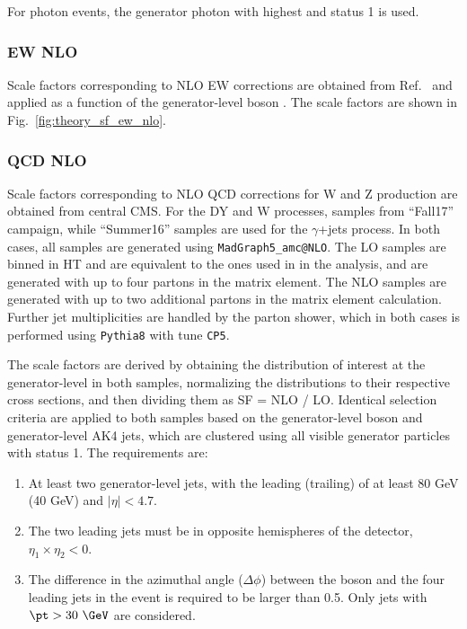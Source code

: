 For photon events, the generator photon with highest \pt and status 1 is used.

\subsubsection{EW NLO}
Scale factors corresponding to NLO EW corrections are obtained from Ref.~\cite{DMTheory} and applied as a function of the generator-level boson \pt. The scale factors are shown in Fig.~\ref{fig:theory_sf_ew_nlo}.

\subsubsection{QCD NLO}

Scale factors corresponding to NLO QCD corrections for W and Z production are obtained from central CMS. For the DY and W processes, samples from ``Fall17'' campaign, while ``Summer16'' samples are used for the $\gamma$+jets process. In both cases, all samples are generated using \texttt{MadGraph5\_amc@NLO}. The LO samples are binned in HT and are equivalent to the ones used in in the analysis, and are generated with up to four partons in the matrix element. The NLO samples are generated with up to two additional partons in the matrix element calculation. Further jet multiplicities are handled by the parton shower, which in both cases is performed using \texttt{Pythia8} with tune \texttt{CP5}.

The scale factors are derived by obtaining the distribution of interest at the generator-level in both samples, normalizing the distributions to their respective cross sections, and then dividing them as SF = NLO / LO. Identical selection criteria are applied to both samples based on the generator-level boson and generator-level AK4 jets, which are clustered using all visible generator particles with status 1. The requirements are:

\begin{enumerate}
\item At least two generator-level jets, with the leading (trailing) \pt of at least 80 GeV (40 GeV) and $|\eta|<4.7$.
\item The two leading jets must be in opposite hemispheres of the detector, $\eta_{1}\times \eta_{2}<0$.
\item The difference in the azimuthal angle ($\Delta\phi$) between the boson and the four leading jets in the event is required to be larger than 0.5. Only jets with $\pt>30~\GeV$ are considered.
\end{enumerate}

